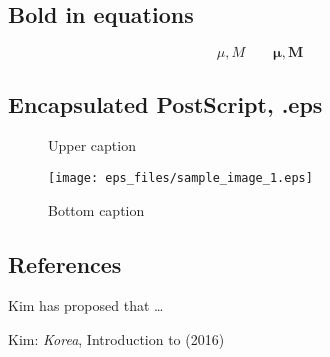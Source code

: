 \documentclass[12pt, oneside]{article}
\begin{document}
\subsection{Bold in equations}
\begin{displaymath}
\mu, M \qquad
\boldsymbol{\mu}, \boldsymbol{M}
\end{displaymath}



\subsection{Encapsulated PostScript, .eps}
\begin{figure}
\centering
\caption{Upper caption}
\texttt{[image: eps\_files/sample\_image\_1.eps]}
\caption{Bottom caption}
\end{figure}
\newpage



\subsection{References}
Kim \cite{sample_cite_1} has proposed that \ldots
\begin{thebibliography}{99} %
 Kim:
\emph{Korea},
Introduction to \LaTeXe (2016)
\end{thebibliography}





\end{document}
